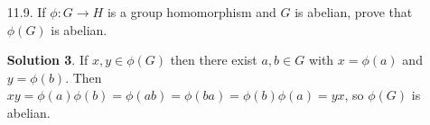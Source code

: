 \documentclass{article}
\newcommand{\RR}{\mathbb{R}}
\DeclareMathOperator{\GL}{GL}
\DeclareMathOperator{\SL}{SL}
\theoremstyle{definition}
\newtheorem*{solution}{Solution}
\begin{document}
\begin{enumerate}
\begin{enumerate}
\begin{solution}
\begin{align*}
\end{align*}
The kernel is $\SL_2(\RR)$, the subgroup of $\GL_2(\RR)$ consisting of matrices of determinant $1$.
\end{solution}
\item $\phi : \mathbb{M}_2(\RR) \to \RR$ defined by 
\[
\phi\left(\begin{psmallmatrix} a & b \\ c & d \end{psmallmatrix}\right) = b,
\]
where $\mathbb{M}_2(\RR)$ is the additive group of $2 \times 2$ matrices with entries in $\RR$.
\begin{solution}
This is a homomorphism, since
\[
\phi\left(\begin{pmatrix} a & b \\ c & d \end{pmatrix} + \begin{pmatrix} a' & b' \\ c' & d' \end{pmatrix}\right) = b + b' = \phi\left(\begin{pmatrix} a & b \\ c & d \end{pmatrix}\right) + \phi\left(\begin{pmatrix} a' & b' \\ c' & d' \end{pmatrix}\right).
\]
The kernel is the group (under addition) of lower triangular matrices:
\[
\left\{\begin{pmatrix} a & 0 \\ b & c \end{pmatrix} : a, b, c \in \RR\right\}.
\]
\end{solution}
\end{enumerate}
\item[11.9.] If $\phi : G \to H$ is a group homomorphism and $G$ is abelian, prove that $\phi(G)$ is abelian.
\begin{solution}
If $x, y \in \phi(G)$ then there exist $a,b \in G$ with $x = \phi(a)$ and $y = \phi(b)$.  Then $xy = \phi(a)\phi(b) = \phi(ab) = \phi(ba) = \phi(b)\phi(a) = yx$, so $\phi(G)$ is abelian.
\end{solution}
\end{enumerate}
\end{document}
